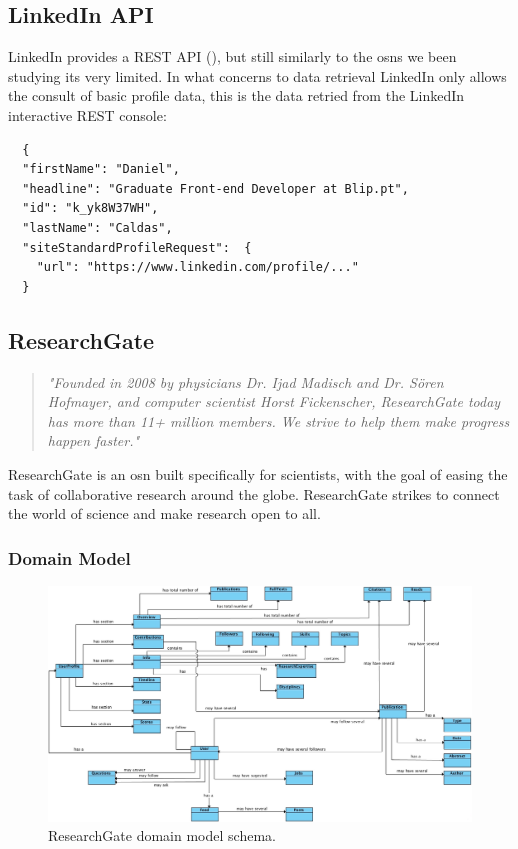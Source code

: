 \subsection*{LinkedIn API}
LinkedIn provides a REST API (\cite{linkapi}), but still similarly to the \glspl{osn} we been studying its very limited. In what concerns to data retrieval LinkedIn only allows
the consult of basic profile data, this is the data retried from the LinkedIn interactive REST console:\\

\begin{verbatim}
  {
  "firstName": "Daniel",
  "headline": "Graduate Front-end Developer at Blip.pt",
  "id": "k_yk8W37WH",
  "lastName": "Caldas",
  "siteStandardProfileRequest":  {
    "url": "https://www.linkedin.com/profile/..."
  }
\end{verbatim}

\subsection{ResearchGate}

\begin{quote}
\textit{"Founded in 2008 by physicians Dr. Ijad Madisch and Dr. Sören Hofmayer, and computer scientist
Horst Fickenscher, ResearchGate today has more than 11+ million members. We strive to help them make progress happen faster."} \cite{rgate}
\end{quote}

ResearchGate is an \gls{osn} built specifically for scientists, with the goal of easing the task of collaborative research around the globe. ResearchGate
strikes to connect the world of science and make research open to all.

\subsubsection*{Domain Model}

\begin{figure}[h!]
  \hspace*{-1in}
  \includegraphics[width=1.20\textwidth]{img/researchgate-domain-model.jpg}
\caption{\label{img:rgatedomain} ResearchGate domain model schema.}
\end{figure}

